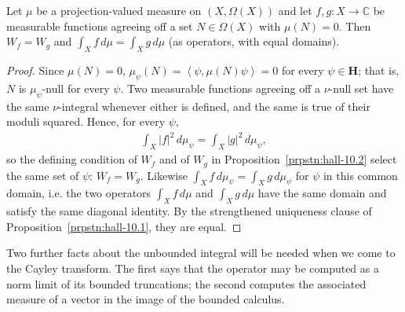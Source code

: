 \begin{lemma}
    \label{lmm:integral-ignores-null-sets}
    \leanok
    Let $\mu$ be a projection-valued measure on $(X,\Omega(X))$ and let $f, g : X \to \mathbb{C}$ be measurable functions agreeing off a set $N \in \Omega(X)$ with $\mu(N) = 0$. Then $W_f = W_g$ and $\int_X f \, d\mu = \int_X g \, d\mu$ (as operators, with equal domains).
\end{lemma}
\begin{proof}
    \leanok
Since $\mu(N) = 0$, $\mu_\psi(N) = \left< \psi, \mu(N)\psi \right> = 0$ for every $\psi \in \mathbf{H}$; that is, $N$ is $\mu_\psi$-null for every $\psi$. Two measurable functions agreeing off a $\nu$-null set have the same $\nu$-integral whenever either is defined, and the same is true of their moduli squared. Hence, for every $\psi$,
\begin{align}
    \int_X \lvert f \rvert^2 \, d\mu_\psi = \int_X \lvert g \rvert^2 \, d\mu_\psi,
\end{align}
so the defining condition of $W_f$ and of $W_g$ in Proposition~\ref{prpstn:hall-10.2} select the same set of $\psi$: $W_f = W_g$. Likewise $\int_X f \, d\mu_\psi = \int_X g \, d\mu_\psi$ for $\psi$ in this common domain, i.e. the two operators $\int_X f \, d\mu$ and $\int_X g \, d\mu$ have the same domain and satisfy the same diagonal identity. By the strengthened uniqueness clause of Proposition~\ref{prpstn:hall-10.1}, they are equal.
\end{proof}

Two further facts about the unbounded integral will be needed when we come to the Cayley transform. The first says that the operator may be computed as a norm limit of its bounded truncations; the second computes the associated measure of a vector in the image of the bounded calculus.

